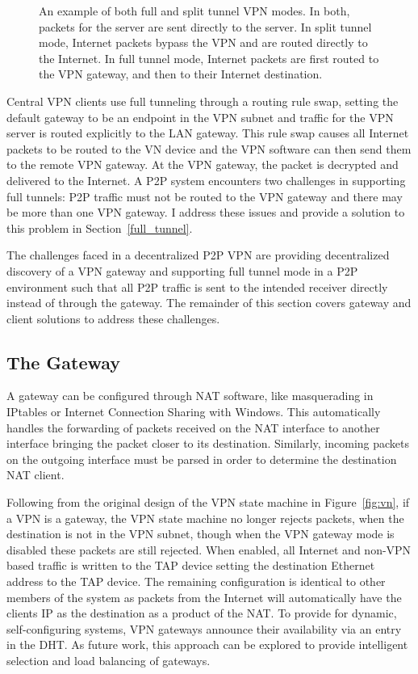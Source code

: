 \begin{figure}
\centering
{}
\caption[An example of both full and split tunnel VPN modes]{An example of both
full and split tunnel VPN modes.  In both, packets for the server are sent
directly to the server.  In split tunnel mode, Internet packets bypass the VPN
and are routed directly to the Internet.  In full tunnel mode, Internet packets
are first routed to the VPN gateway, and then to their Internet destination.}
\label{fig:tunnel}
\end{figure}

Central VPN clients use full tunneling through a routing rule swap, setting the
default gateway to be an endpoint in the VPN subnet and traffic for the VPN
server is routed explicitly to the LAN gateway.  This rule swap causes all
Internet packets to be routed to the VN device and the VPN software can then
send them to the remote VPN gateway.  At the VPN gateway, the packet is
decrypted and delivered to the Internet.  A P2P system encounters two
challenges in supporting full tunnels:  P2P traffic must not be routed to the
VPN gateway and there may be more than one VPN gateway.  I address these issues
and provide a solution to this problem in Section~\ref{full_tunnel}.

The challenges faced in a decentralized P2P VPN are providing decentralized
discovery of a VPN gateway and supporting full tunnel mode in a P2P environment
such that all P2P traffic is sent to the intended receiver directly instead of
through the gateway.  The remainder of this section covers gateway and
client solutions to address these challenges.

\subsection{The Gateway}
\label{the_gateway}
A gateway can be configured through NAT software, like masquerading in IPtables
or Internet Connection Sharing with Windows.  This automatically handles the
forwarding of packets received on the NAT interface to another interface
bringing the packet closer to its destination.  Similarly, incoming packets
on the outgoing interface must be parsed in order to determine the destination
NAT client.

Following from the original design of the VPN state machine in
Figure~\ref{fig:vn}, if a VPN is a gateway, the VPN state machine no longer
rejects packets, when the destination is not in the VPN subnet, though when the
VPN gateway mode is disabled these packets are still rejected.  When enabled,
all Internet and non-VPN based traffic is written to the TAP device setting the
destination Ethernet address to the TAP device.  The remaining configuration is
identical to other members of the system as packets from the Internet will
automatically have the clients IP as the destination as a product of the NAT.
To provide for dynamic, self-configuring systems, VPN gateways announce their
availability via an entry in the DHT.  As future work, this approach can be
explored to provide intelligent selection and load balancing of gateways.

